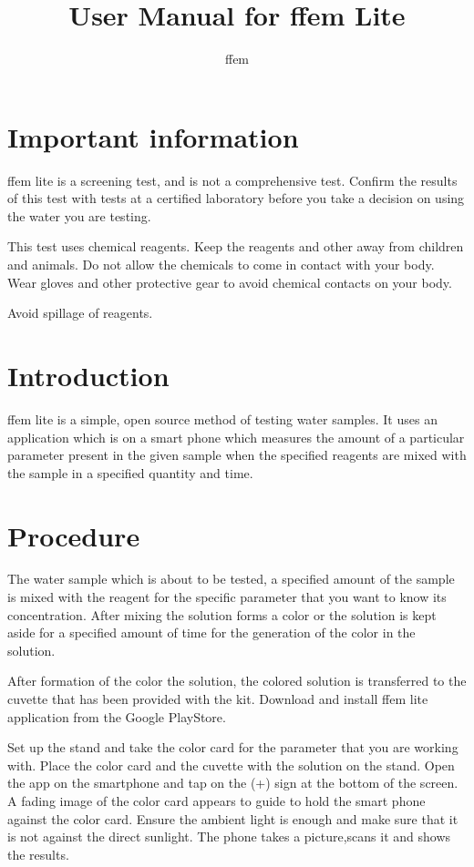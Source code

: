 \documentclass{article}
\title{User Manual for ffem Lite }
\author{ffem}
\begin{document}
    \maketitle
    
       
\section{Important information }

ffem lite is a screening test, and is not a comprehensive test. Confirm the results of this test with tests at a certified laboratory before you take a decision on using the water you are testing.

This test uses chemical reagents. Keep the reagents and other away from children and animals. Do not allow the chemicals to come in contact with your body. Wear gloves and other protective gear to avoid chemical contacts on your body.

 Avoid spillage of reagents.


\section{Introduction}

ffem lite is a simple, open source method of testing water samples. It uses an application which is on a smart phone which measures the amount of a particular parameter present in the given sample when the specified reagents are mixed with the sample in a specified quantity and time.

\section{Procedure}

The water sample which is about to be tested, a specified amount of the sample is mixed with the reagent for the specific parameter that you want to know its concentration. After mixing the solution forms a color or the solution is kept aside for a specified amount of time for the generation of the color in the solution.

After formation of the color the solution, the colored solution is transferred to the cuvette that has been provided with the kit. Download and install ffem lite application from the Google PlayStore.

Set up the stand and take the color card for the parameter that you are working with. Place the color card and the cuvette with the solution on the stand.
 Open the app on the smartphone and tap on the (+) sign at the bottom of the screen. A fading image of the color card appears to guide to hold the smart phone against the color card. Ensure the ambient light is enough and make sure that it is not against the direct sunlight.
  The phone takes a picture,scans it and shows the results.
\end{document}
